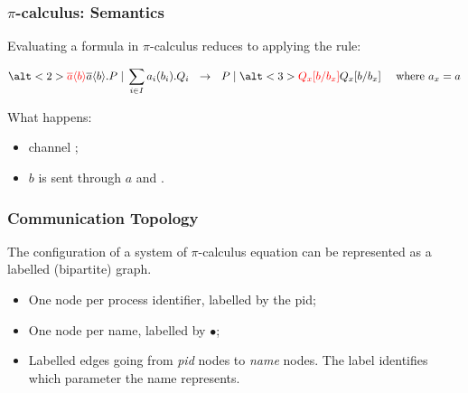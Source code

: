 \documentclass{beamer}
\newcommand{\pical}{$\pi$-calculus}
\begin{document}
\begin{frame}
\frametitle{$\pi$-calculus: Semantics}
Evaluating a formula in $\pi$-calculus reduces to applying the rule:


\begin{equation*}
\alt<2>{\textcolor{red}{\overline{a}\langle b \rangle}}{\overline{a}\langle b \rangle}.P \;|\; \sum_{i \in I} a_i(b_i).Q_i
~~ \rightarrow ~~
P \;|\; \alt<3>{\textcolor{red}{Q_x[b/b_x]}}{Q_x[b/b_x]}
~~~~ \text{where $a_x = a$}
\end{equation*}

\vspace{10pt}

What happens:
\begin{itemize}
\item channel ;
\item $b$ is sent through $a$ and .
\end{itemize}
\end{frame}


\iffalse
\begin{frame}
  \frametitle{Communication Topology}
  The configuration of a system of \pical{} equation can be represented as a labelled (bipartite) graph.
  \begin{itemize}
  \item One node per process identifier, labelled by the pid;
  \item One node per name, labelled by $\bullet$;
  \item Labelled edges going from \emph{pid} nodes to \emph{name} nodes.
  The label identifies which parameter the name represents.
  \end{itemize}
\end{frame}
\end{document}
